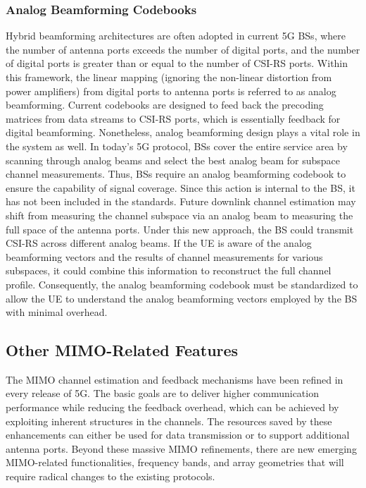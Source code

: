 \documentclass[lettersize,journal]{IEEEtran}
\begin{document}
\subsubsection{Analog Beamforming Codebooks}
Hybrid beamforming architectures are often adopted in current 5G BSs, where the number of antenna ports exceeds the number of digital ports, and the number of digital ports is greater than or equal to the number of CSI-RS ports. Within this framework, the linear mapping  (ignoring the non-linear distortion from power amplifiers) from digital ports to antenna ports is referred to as analog beamforming. Current codebooks are designed to feed back the precoding matrices from data streams to CSI-RS ports, which is essentially feedback for digital beamforming. Nonetheless, analog beamforming design plays a vital role in the system as well. In today's 5G protocol, BSs cover the entire service area by scanning through analog beams and select the best analog beam for subspace channel measurements. Thus, BSs require an analog beamforming codebook to ensure the capability of signal coverage. Since this action is internal to the BS, it has not been included in the standards. Future downlink channel estimation may shift from measuring the channel subspace via an analog beam to measuring the full space of the antenna ports. Under this new approach, the BS could transmit CSI-RS across different analog beams. If the UE is aware of the analog beamforming vectors and the results of channel measurements for various subspaces, it could combine this information to reconstruct the full channel profile. Consequently, the analog beamforming codebook must be standardized to allow the UE to understand the analog beamforming vectors employed by the BS with minimal overhead. 

\subsection{Other MIMO-Related Features}

The MIMO channel estimation and feedback mechanisms have been refined in every release of 5G. The basic goals are to deliver higher communication performance while reducing the feedback overhead, which can be achieved by exploiting inherent structures in the channels. The resources saved by these enhancements can either be used for data transmission or to support additional antenna ports.  Beyond these massive MIMO refinements, there are new emerging MIMO-related functionalities, frequency bands, and array geometries that will require radical changes to the existing protocols.
\end{document}
